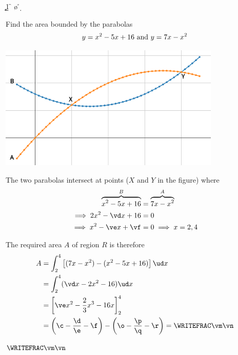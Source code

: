 

\ADD\va\vc\vd 
\DIVIDE{}\ve
\DIVIDE{}\vf 

\SQUARE\vy\a
\MULTIPLY\a\vy\b
\MULTIPLY\a\ve\c
{}\b{1}\d\e
\MULTIPLY\vb\vy\f

\SQUARE\vx\m
\MULTIPLY\m\vx\n
\MULTIPLY\m\ve\o
{}\p\q
\MULTIPLY\vb\vx\r

\EXPR[0]\vp{\c-\f-\o+\r}
\FRACMINUS\p\q\d\e\vq\vr
\FRACADD{}\vq\vr\vm\vn

\question[3] Find the area bounded by the parabolas 
\[ y = x^2-5 x+16\text{ and }y=7 x-x^2 \]
\watchout

\ifprintanswers
  \vspace{0.3cm}
  \includegraphics[width=300pt]{plotly.eps}
\fi

\begin{solution}[\fullpage]
	The two parabolas intersect at points ($X$ and $Y$ in the figure) where 
  \begin{align}
    \overbrace{x^2-\va x + \vb}^{B} &= \overbrace{\vc x - x^2}^{A} \\
    \implies 2x^2 - \vd x + \vb &= 0 \\ 
    \implies x^2-\ve x + \vf &= 0 \implies x=\vx,\vy 
  \end{align}
	
	The required area $A$ of region $R$ is therefore
	\begin{align}
	  A &= \int_\vx^\vy\left[ (\vc x-x^2) - (x^2-\va x + \vb)\right]\ud x \\
	    &= \int_\vx^\vy (\vd x - 2x^2 - \vb) \ud x \\
      &= \left[ \ve x^2 -\dfrac{2}{3}x^3 - \vb x\right]_\vx^\vy \\
      &= \left(\c - \dfrac\d\e - \f\right) - \left( \o-\dfrac\p\q - \r\right) = \WRITEFRAC\vm\vn
	\end{align}
\end{solution}

\ifprintanswers\begin{codex}$\WRITEFRAC\vm\vn$\end{codex}\fi
